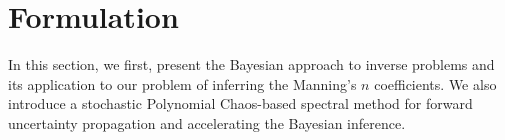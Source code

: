 \section{Formulation}
\label{sec:formu}
In this section, we first, present the Bayesian approach to inverse problems 
and its application to our problem of inferring the Manning's $n$ coefficients.
We also introduce
a stochastic Polynomial Chaos-based spectral method for forward uncertainty propagation and accelerating the Bayesian inference.





